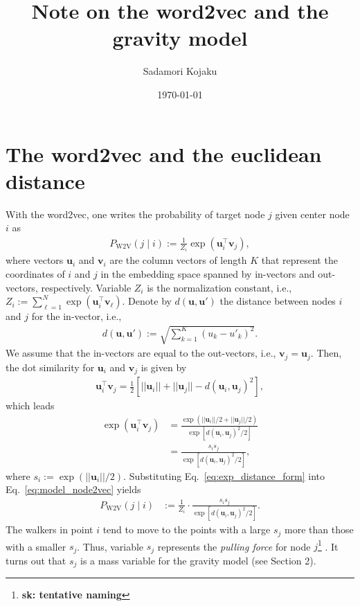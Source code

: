\documentclass[12pt]{article} %
\def\given{\mid}
\def\vec#1{{\bm #1}}
\def\sada#1{\footnote{\color{light-blue}\textbf{sk: #1}} }
\begin{document}

\title{Note on the word2vec and the gravity model} %
\date{\today}
\author{Sadamori Kojaku}
\maketitle %

\section{The word2vec and the euclidean distance}

With the word2vec, one writes the probability of target node $j$ given center node $i$ as 
\begin{align}
  \label{eq:model_node2vec}
    P_{\text{W2V}}\left(j \given i\right) := \frac{1}{Z_i}\exp\left(\vec{u} ^\top _{i} \vec{v}_{j}\right), 
\end{align}
where vectors $\vec{u}_i$ and $\vec{v}_i$ are the column vectors of length $K$ that represent the coordinates of $i$ and $j$ in the embedding space spanned by in-vectors and out-vectors, respectively.
Variable $Z_i$ is the normalization constant, i.e., $Z_i:= \sum_{\ell=1}^N \exp\left(\vec{u} ^\top _{i} \vec{v}_{\ell}\right)$. 
Denote by $d(\vec{u},\vec{u}')$ the distance between nodes $i$ and $j$ for the in-vector, i.e., 
\begin{align}
    \label{eq:distance}
    d(\vec{u},\vec{u}'):= \sqrt{\sum_{k=1}^K \left(u_{k} - u'_{k}\right)^2}.
\end{align}
We assume that the in-vectors are equal to the out-vectors, i.e., $\vec{v}_j = \vec{u}_j$.
Then, the dot similarity for $\vec{u}_i$ and $\vec{v}_j$ is given by 
\begin{align}
    \label{eq:dotsim}
    \vec{u}_i ^\top \vec{v}_j = \frac{1}{2}\left[ ||\vec{u}_i|| + ||\vec{u}_j|| - d\left(\vec{u}_i, \vec{u}_j\right)^2 \right],
\end{align}
which leads 
\begin{align}
    \exp\left( \vec{u}_i ^\top \vec{v}_j \right) &= \frac{\exp\left( ||\vec{u}_i||/2 + ||\vec{u}_j||/2 \right)}{\exp\left[ d\left(\vec{u}_i, \vec{u}_j\right)^2 / 2 \right]} \nonumber \\
                                                 &= \frac{s_i s_j}{\exp\left[d\left(\vec{u}_i, \vec{u}_j\right)^2 / 2\right]}, \label{eq:exp_distance_form}
\end{align}
where $s_i:=\exp(||\vec{u}_i||/2)$. 
Substituting Eq.~\eqref{eq:exp_distance_form} into Eq.~\eqref{eq:model_node2vec} yields
\begin{align}
    \label{eq:model_node2vec_distance}
    P_{\text{W2V}}\left(j \given i\right) &:= \frac{1}{Z_i}\cdot \frac{s_is_j}{\exp\left[d\left(\vec{u}_i, \vec{u}_j\right)^2/2\right]}. 
\end{align}
The walkers in point $i$ tend to move to the points with a large $s_j$ more than those with a smaller $s_j$.
Thus, variable $s_j$ represents the {\it pulling force} for node $j$\sada{tentative naming}. 
It turns out that $s_j$ is a mass variable for the gravity model (see Section 2). 
\end{document}

